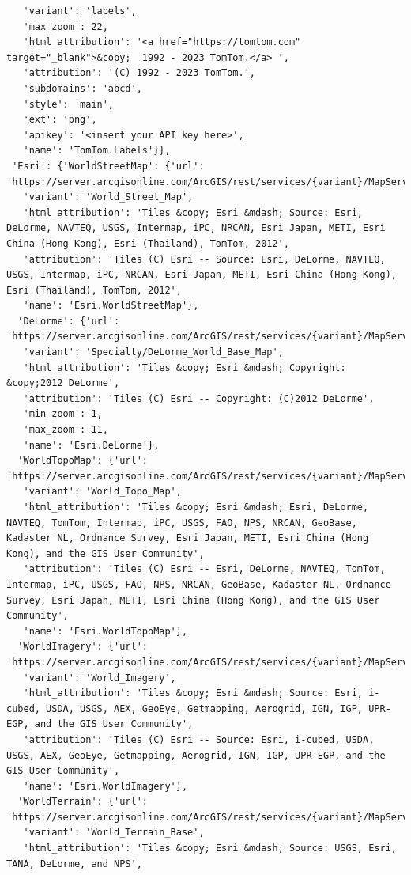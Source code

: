 \documentclass[
  letterpaper,
  DIV=11,
  numbers=noendperiod]{scrreprt}
\begin{document}
\begin{verbatim}
   'variant': 'labels',
   'max_zoom': 22,
   'html_attribution': '<a href="https://tomtom.com" target="_blank">&copy;  1992 - 2023 TomTom.</a> ',
   'attribution': '(C) 1992 - 2023 TomTom.',
   'subdomains': 'abcd',
   'style': 'main',
   'ext': 'png',
   'apikey': '<insert your API key here>',
   'name': 'TomTom.Labels'}},
 'Esri': {'WorldStreetMap': {'url': 'https://server.arcgisonline.com/ArcGIS/rest/services/{variant}/MapServer/tile/{z}/{y}/{x}',
   'variant': 'World_Street_Map',
   'html_attribution': 'Tiles &copy; Esri &mdash; Source: Esri, DeLorme, NAVTEQ, USGS, Intermap, iPC, NRCAN, Esri Japan, METI, Esri China (Hong Kong), Esri (Thailand), TomTom, 2012',
   'attribution': 'Tiles (C) Esri -- Source: Esri, DeLorme, NAVTEQ, USGS, Intermap, iPC, NRCAN, Esri Japan, METI, Esri China (Hong Kong), Esri (Thailand), TomTom, 2012',
   'name': 'Esri.WorldStreetMap'},
  'DeLorme': {'url': 'https://server.arcgisonline.com/ArcGIS/rest/services/{variant}/MapServer/tile/{z}/{y}/{x}',
   'variant': 'Specialty/DeLorme_World_Base_Map',
   'html_attribution': 'Tiles &copy; Esri &mdash; Copyright: &copy;2012 DeLorme',
   'attribution': 'Tiles (C) Esri -- Copyright: (C)2012 DeLorme',
   'min_zoom': 1,
   'max_zoom': 11,
   'name': 'Esri.DeLorme'},
  'WorldTopoMap': {'url': 'https://server.arcgisonline.com/ArcGIS/rest/services/{variant}/MapServer/tile/{z}/{y}/{x}',
   'variant': 'World_Topo_Map',
   'html_attribution': 'Tiles &copy; Esri &mdash; Esri, DeLorme, NAVTEQ, TomTom, Intermap, iPC, USGS, FAO, NPS, NRCAN, GeoBase, Kadaster NL, Ordnance Survey, Esri Japan, METI, Esri China (Hong Kong), and the GIS User Community',
   'attribution': 'Tiles (C) Esri -- Esri, DeLorme, NAVTEQ, TomTom, Intermap, iPC, USGS, FAO, NPS, NRCAN, GeoBase, Kadaster NL, Ordnance Survey, Esri Japan, METI, Esri China (Hong Kong), and the GIS User Community',
   'name': 'Esri.WorldTopoMap'},
  'WorldImagery': {'url': 'https://server.arcgisonline.com/ArcGIS/rest/services/{variant}/MapServer/tile/{z}/{y}/{x}',
   'variant': 'World_Imagery',
   'html_attribution': 'Tiles &copy; Esri &mdash; Source: Esri, i-cubed, USDA, USGS, AEX, GeoEye, Getmapping, Aerogrid, IGN, IGP, UPR-EGP, and the GIS User Community',
   'attribution': 'Tiles (C) Esri -- Source: Esri, i-cubed, USDA, USGS, AEX, GeoEye, Getmapping, Aerogrid, IGN, IGP, UPR-EGP, and the GIS User Community',
   'name': 'Esri.WorldImagery'},
  'WorldTerrain': {'url': 'https://server.arcgisonline.com/ArcGIS/rest/services/{variant}/MapServer/tile/{z}/{y}/{x}',
   'variant': 'World_Terrain_Base',
   'html_attribution': 'Tiles &copy; Esri &mdash; Source: USGS, Esri, TANA, DeLorme, and NPS',

\end{verbatim}
\end{document}
